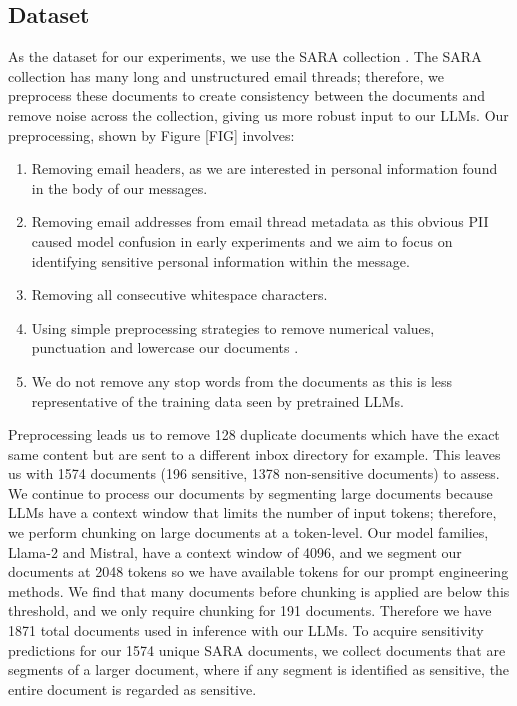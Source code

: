 \subsection{Dataset}
As the dataset for our experiments, we use the SARA collection \cite{mckechnie2024sara}. The SARA collection has many long and unstructured email threads; therefore, we preprocess these documents to create consistency between the documents and remove noise across the collection, giving us more robust input to our LLMs. Our preprocessing, shown by Figure [FIG] involves:
\begin{enumerate}
    \item Removing email headers, as we are interested in personal information found in the body of our messages.
    \item Removing email addresses from email thread metadata as this obvious PII caused model confusion in early experiments and we aim to focus on identifying sensitive personal information within the message.
    \item Removing all consecutive whitespace characters.
    \item Using simple preprocessing strategies to remove numerical values, punctuation and lowercase our documents \cite{rehurek2011gensim}.
    \item We do not remove any stop words from the documents as this is less representative of the training data seen by pretrained LLMs.
\end{enumerate}

Preprocessing leads us to remove 128 duplicate documents which have the exact same content but are sent to a different inbox directory for example. This leaves us with 1574 documents (196 sensitive, 1378 non-sensitive documents) to assess. We continue to process our documents by segmenting large documents because LLMs have a context window that limits the number of input tokens; therefore, we perform chunking on large documents at a token-level. Our model families, Llama-2 and Mistral, have a context window of 4096, and we segment our documents at 2048 tokens so we have available tokens for our prompt engineering methods. We find that many documents before chunking is applied are below this threshold, and we only require chunking for 191 documents. Therefore we have 1871 total documents used in inference with our LLMs. To acquire sensitivity predictions for our 1574 unique SARA documents, we collect documents that are segments of a larger document, where if any segment is identified as sensitive, the entire document is regarded as sensitive.

